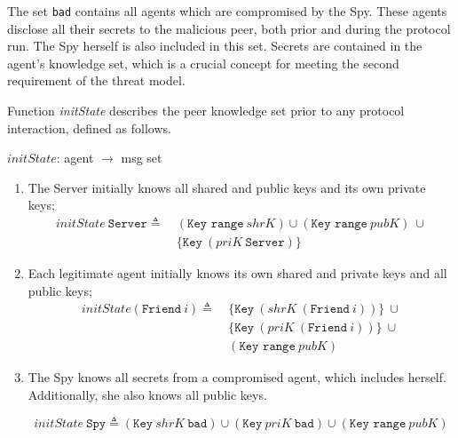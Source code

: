 The set \texttt{bad} contains all agents which are compromised by the Spy. These agents disclose all their secrets to the malicious peer, both prior and during the protocol run. The Spy herself is also included in this set. Secrets are contained in the agent's knowledge set, which is a crucial concept for meeting the second requirement of the threat model.

Function \textit{initState} describes the peer knowledge set prior to any protocol interaction, defined as follows.

\begin{center}
  {\ttfamily \(initState\): agent \(\longrightarrow \) msg set}
\end{center}

\begin{enumerate}
  \item The Server initially knows all shared and public keys and its own private keys;
  \begin{equation*}
    \begin{split}
      initState\ \texttt{Server} \triangleq\
      & (\texttt{Key range}\ shrK) \cup (\texttt{Key range}\ pubK)\ \cup \\
      & \{\texttt{Key}\ (priK\ \texttt{Server})\}
    \end{split}
  \end{equation*}
  \item Each legitimate agent initially knows its own shared and private keys and all public keys;
  \begin{equation*}
    \begin{split}
      initState (\texttt{Friend}\ \textit{i}) \triangleq\
      & \{ \texttt{Key}\ (shrK\ (\texttt{Friend}\ i))\}\ \cup \\
      & \{ \texttt{Key}\ (priK\ (\texttt{Friend}\ i))\}\ \cup \\
      & (\texttt{Key range}\ pubK)
    \end{split}
  \end{equation*}
  \item The Spy knows all secrets from a compromised agent, which includes herself. Additionally, she also knows all public keys.
  \begin{center}
    \[
      initState\ \texttt{Spy} \triangleq (\texttt{Key}\ shrK\ \texttt{bad}) \cup (\texttt{Key}\ priK\ \texttt{bad}) \cup (\texttt{Key range}\ pubK)
    \]
  \end{center}
\end{enumerate}

